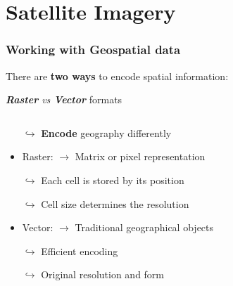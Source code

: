 \documentclass[xcolor=x11names,compress]{beamer}
\renewcommand{\(}{\begin{columns}}
\renewcommand{\)}{\end{columns}}
\newcommand{\<}[1]{\begin{column}{#1}}
\renewcommand{\>}{\end{column}}
\begin{document}
\section{Satellite Imagery }

\begin{frame}
    \frametitle{Working with Geospatial data  }
There are \textbf{two ways} to encode spatial information:\\
\begin{center} \emph{\textbf{Raster} vs \textbf{Vector}} formats  \end{center}
\pause
    \begin{columns}[T]
        \begin{column}{0.6\textwidth}
            \begin{itemize}[<+->]
            \item[$\hookrightarrow$] \textbf{Encode} geography differently
             \item Raster: $\rightarrow $  Matrix or pixel representation
             \item[$\hookrightarrow$] Each cell is stored by its position
             \item[$\hookrightarrow$] Cell size determines the resolution
             \item Vector:  $\rightarrow $  Traditional geographical objects
             \item[$\hookrightarrow$] Efficient encoding
             \item[$\hookrightarrow$] Original resolution and form
            \end{itemize}
        \end{column}
        \begin{column}{0.4\textwidth}
        \begin{itemize}
             \item[]

\end{itemize}
\end{column}
\end{columns}
\end{frame}
\end{document}

